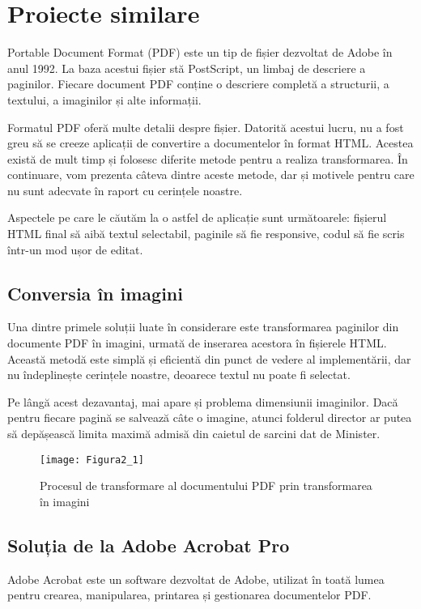 \chapter{Proiecte similare}

Portable Document Format (PDF) este un tip de fișier dezvoltat de Adobe în anul 1992. La baza acestui fișier stă PostScript, un limbaj de descriere a paginilor. Fiecare document PDF conține o descriere completă a structurii, a textului, a imaginilor și alte informații.

Formatul PDF oferă multe detalii despre fișier. Datorită acestui lucru, nu a fost greu să se creeze aplicații de convertire a documentelor în format HTML. Acestea există de mult timp și folosesc diferite metode pentru a realiza transformarea. În continuare, vom prezenta câteva dintre aceste metode, dar și motivele pentru care nu sunt adecvate în raport cu cerințele noastre.

Aspectele pe care le căutăm la o astfel de aplicație sunt următoarele: fișierul HTML final să aibă textul selectabil, paginile să fie responsive, codul să fie scris într-un mod ușor de editat.


\section{Conversia în imagini}

Una dintre primele soluții luate în considerare este transformarea paginilor din documente PDF în imagini, urmată de inserarea acestora în fișierele HTML. Această metodă este simplă și eficientă din punct de vedere al implementării, dar nu îndeplinește cerințele noastre, deoarece textul nu poate fi selectat.

Pe lângă acest dezavantaj, mai apare și problema dimensiunii imaginilor. Dacă pentru fiecare pagină se salvează câte o imagine, atunci folderul director ar putea să depășească limita maximă admisă din caietul de sarcini dat de Minister.
\begin{figure}[H]
	\centering
	\texttt{[image: Figura2\_1]}
	\caption{Procesul de transformare al documentului PDF prin transformarea în imagini}
	\label{fig:Figura2_1}
\end{figure}


\section{Soluția de la Adobe Acrobat Pro}

Adobe Acrobat \cite{padova2008adobe} este un software dezvoltat de Adobe, utilizat în toată lumea pentru crearea, manipularea, printarea și gestionarea documentelor PDF.

